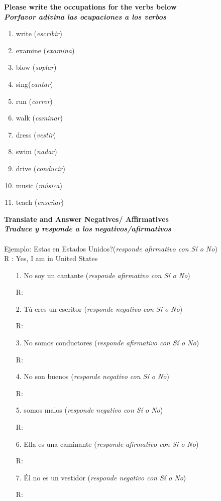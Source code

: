 \documentclass{article}
\begin{document}
\noindent \textbf{Please write the occupations for the verbs below}\\
\noindent \textbf{\textit{Porfavor adivina las ocupaciones a los verbos}}

\begin{enumerate}
\item write (\textit{escribir}) 
\item examine (\textit{examina}) 
\item blow (\textit{soplar}) 
\item sing(\textit{cantar}) 
\item run (\textit{correr}) 
\item walk (\textit{caminar}) 
\item dress (\textit{vestir}) 
\item swim (\textit{nadar}) 
\item drive (\textit{conducir}) 
\item music (\textit{m\'usica}) 
\item teach (\textit{ense\^nar}) 
\end{enumerate}

\noindent \textbf{Translate and Answer Negatives/ Affirmatives}\\
\noindent \textbf{\textit{Traduce y responde a los negativos/afirmativos}}\\\\

\noindent Ejemplo: Estas en Estados Unidos?(\textit{responde afirmativo con S\'i o No})\\
\noindent R \quad \quad \quad : Yes, I am in United States \\
\begin{itemize}
\item[1.] No soy un cantante (\textit{responde afirmativo con S\'i o No})
\item[R:]
\item[2.] T\'u eres un escritor (\textit{responde negativo con S\'i o No})
\item[R:] 
\item[3.] No somos conductores (\textit{responde afirmativo con S\'i o No})
\item[R:]
\item[4.] No son buenos (\textit{responde negativo con S\'i o No})
\item[R:]
\item[5.] somos malos (\textit{responde negativo con S\'i o No})
\item[R:]
\item[6.] Ella es una caminante (\textit{responde afirmativo con S\'i o No})
\item[R:]
\item[7.] \'El no es un vestidor (\textit{responde negativo con S\'i o No})
\item[R:]
\end{itemize}
\end{document}
